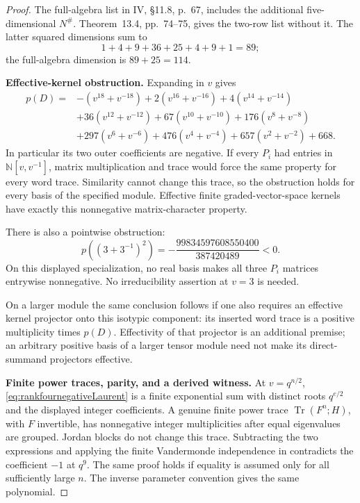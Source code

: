 \begin{proof}
The full-algebra list in IV, \S11.8, p.~67, includes
the additional five-dimensional \(N^\#\).
Theorem~13.4, pp.~74--75, gives the two-row list without it.
The latter squared dimensions sum to
\[
 1+4+9+36+25+4+9+1=89;
\]
the full-algebra dimension is \(89+25=114\).

\par\smallskip\noindent\textbf{Effective-kernel obstruction.}\quad
Expanding in \(v\) gives
\begin{equation}\label{eq:rankfournegativeLaurent}
\begin{split}
p(D)={}&-(v^{18}+v^{-18})+2(v^{16}+v^{-16})
 +4(v^{14}+v^{-14})\\
&+36(v^{12}+v^{-12})+67(v^{10}+v^{-10})
 +176(v^8+v^{-8})\\
&+297(v^6+v^{-6})+476(v^4+v^{-4})
 +657(v^2+v^{-2})+668.
\end{split}
\end{equation}
In particular its two outer coefficients are negative.
If every \(P_i\) had entries in
\(\mathbb N[v,v^{-1}]\), matrix multiplication and trace
would force the same property for every word trace.
Similarity cannot change this trace, so the obstruction
holds for every basis of the specified module.
Effective finite graded-vector-space kernels have exactly
this nonnegative matrix-character property.

There is also a pointwise obstruction:
\[
 p((3+3^{-1})^2)
 =-\frac{99834597608550400}{387420489}<0.
\]
On this displayed specialization, no real basis makes all
three \(P_i\) matrices entrywise nonnegative.
No irreducibility assertion at \(v=3\) is needed.

On a larger module the same conclusion follows if one also
requires an effective kernel projector onto this isotypic
component: its inserted word trace is a positive multiplicity
times \(p(D)\).
Effectivity of that projector is an additional premise;
an arbitrary positive basis of a larger tensor module
need not make its direct-summand projectors effective.

\par\smallskip\noindent\textbf{Finite power traces, parity, and a derived witness.}\quad
At \(v=q^{n/2}\),
\eqref{eq:rankfournegativeLaurent} is a finite exponential
sum with distinct roots \(q^{e/2}\) and the displayed
integer coefficients.
A genuine finite power trace
\(\operatorname{Tr}(F^n;H)\), with \(F\) invertible,
has nonnegative integer multiplicities after equal
eigenvalues are grouped. Jordan blocks do not change this
trace.
Subtracting the two expressions and applying the finite
Vandermonde independence in  contradicts the
coefficient \(-1\) at \(q^9\).
The same proof holds if equality is assumed only for
all sufficiently large \(n\).
The inverse parameter convention gives the same polynomial.


\end{proof}
